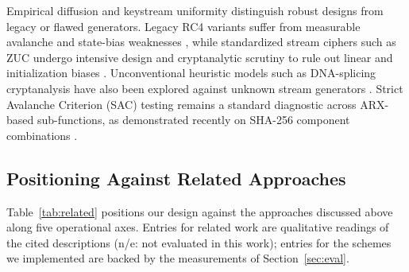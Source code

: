 \documentclass[conference]{IEEEtran}
\begin{document}
Empirical diffusion and keystream uniformity distinguish robust designs from legacy or flawed generators. Legacy RC4 variants suffer from measurable avalanche and state-bias weaknesses \cite{madarrocap2021measuring}, while standardized stream ciphers such as ZUC undergo intensive design and cryptanalytic scrutiny to rule out linear and initialization biases \cite{mukherjee2021design, mukherjee2021cryptanalysis}. Unconventional heuristic models such as DNA-splicing cryptanalysis have also been explored against unknown stream generators \cite{yaseen2021splicing}. Strict Avalanche Criterion (SAC) testing remains a standard diagnostic across ARX-based sub-functions, as demonstrated recently on SHA-256 component combinations \cite{vaughn2026relaxation}.

\subsection{Positioning Against Related Approaches}
Table~\ref{tab:related} positions our design against the approaches discussed above along five operational axes. Entries for related work are qualitative readings of the cited descriptions (n/e: not evaluated in this work); entries for the schemes we implemented are backed by the measurements of Section~\ref{sec:eval}.

\begin{table}[t]
\caption{Qualitative Positioning of Lexical AEAD Against Related Concealment Approaches}
\label{tab:related}
\centering
{}
\end{table}
\end{document}
